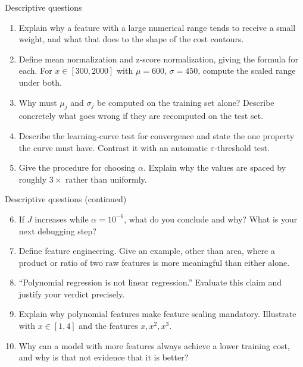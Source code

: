 \documentclass[aspectratio=169,10pt]{beamer}
\begin{document}
\begin{frame}{Descriptive questions}
  \footnotesize
  \begin{enumerate}
    \item Explain why a feature with a large numerical range tends to receive a small weight,
          and what that does to the shape of the cost contours. \hfill{}
    \item Define mean normalization and z-score normalization, giving the formula for each.
          For $x\in[300,2000]$ with $\mu=600$, $\sigma=450$, compute the scaled range under
          both. \hfill{}
    \item Why must $\mu_j$ and $\sigma_j$ be computed on the training set alone? Describe
          concretely what goes wrong if they are recomputed on the test set. \hfill{}
    \item Describe the learning-curve test for convergence and state the one property the
          curve must have. Contrast it with an automatic $\varepsilon$-threshold test.
          \hfill{}
    \item Give the procedure for choosing $\alpha$. Explain why the values are spaced by
          roughly $3\times$ rather than uniformly. \hfill{}
  \end{enumerate}
\end{frame}

\begin{frame}{Descriptive questions (continued)}
  \footnotesize
  \begin{enumerate}\setcounter{enumi}{5}
    \item If $J$ increases while $\alpha = 10^{-6}$, what do you conclude and why? What is
          your next debugging step? \hfill{}
    \item Define feature engineering. Give an example, other than area, where a product or
          ratio of two raw features is more meaningful than either alone. \hfill{}
    \item ``Polynomial regression is not linear regression.'' Evaluate this claim and justify
          your verdict precisely. \hfill{}
    \item Explain why polynomial features make feature scaling mandatory. Illustrate with
          $x\in[1,4]$ and the features $x,x^2,x^3$. \hfill{}
    \item Why can a model with more features always achieve a lower training cost, and why is
          that not evidence that it is better? \hfill{}
  \end{enumerate}
\end{frame}
\end{document}
